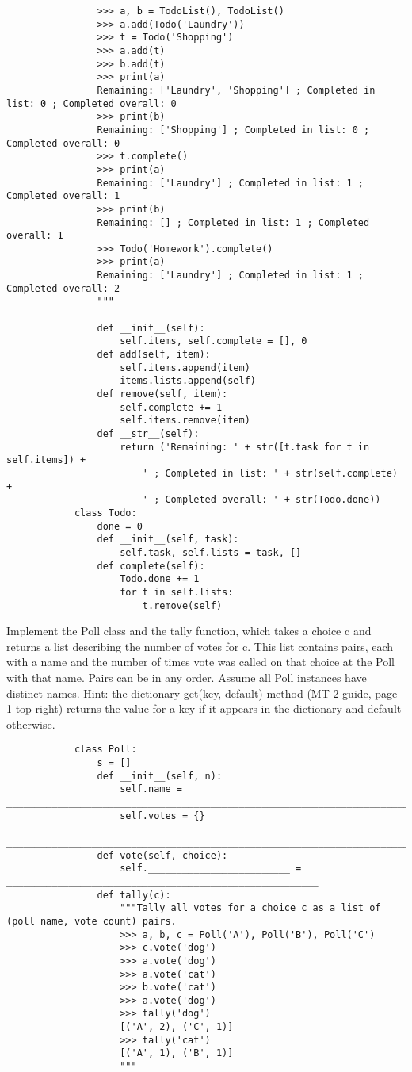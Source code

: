 \documentclass{exam}
\begin{document}
\begin{questions}
\begin{blocksection}
\begin{solution}
\begin{lstlisting}
				>>> a, b = TodoList(), TodoList()
				>>> a.add(Todo('Laundry'))
				>>> t = Todo('Shopping')
				>>> a.add(t)
				>>> b.add(t)
				>>> print(a)
				Remaining: ['Laundry', 'Shopping'] ; Completed in list: 0 ; Completed overall: 0
				>>> print(b)
				Remaining: ['Shopping'] ; Completed in list: 0 ; Completed overall: 0
				>>> t.complete()
				>>> print(a)
				Remaining: ['Laundry'] ; Completed in list: 1 ; Completed overall: 1
				>>> print(b)
				Remaining: [] ; Completed in list: 1 ; Completed overall: 1
				>>> Todo('Homework').complete()
				>>> print(a)
				Remaining: ['Laundry'] ; Completed in list: 1 ; Completed overall: 2
				"""
					
				def __init__(self):
					self.items, self.complete = [], 0
				def add(self, item):
					self.items.append(item)
					items.lists.append(self)
				def remove(self, item):
					self.complete += 1
					self.items.remove(item)
				def __str__(self):
					return ('Remaining: ' + str([t.task for t in self.items]) + 
						' ; Completed in list: ' + str(self.complete) +
						' ; Completed overall: ' + str(Todo.done))
			class Todo:
				done = 0
				def __init__(self, task):
					self.task, self.lists = task, []
				def complete(self):
					Todo.done += 1
					for t in self.lists:
						t.remove(self)
		\end{lstlisting}
	\end{solution}
	\begin{blocksection}
		Implement the Poll class and the tally function, which takes a choice c and returns a list
		describing the number of votes for c. This list contains pairs, each with a name and the number of times
		vote was called on that choice at the Poll with that name. Pairs can be in any order. Assume all Poll
		instances have distinct names. Hint: the dictionary get(key, default) method (MT 2 guide, page 1
		top-right) returns the value for a key if it appears in the dictionary and default otherwise.
		\begin{lstlisting}
			class Poll:
				s = []
				def __init__(self, n):
					self.name = ____________________________________________________________________________
					self.votes = {}
					________________________________________________________________________________________
				def vote(self, choice):
					self._________________________ = _______________________________________________________
				def tally(c):
					"""Tally all votes for a choice c as a list of (poll name, vote count) pairs.
					>>> a, b, c = Poll('A'), Poll('B'), Poll('C')
					>>> c.vote('dog')
					>>> a.vote('dog')
					>>> a.vote('cat')
					>>> b.vote('cat')
					>>> a.vote('dog')
					>>> tally('dog')
					[('A', 2), ('C', 1)]
					>>> tally('cat')
					[('A', 1), ('B', 1)]
					"""
					

\end{lstlisting}
\end{blocksection}
\end{blocksection}
\end{questions}
\end{document}
